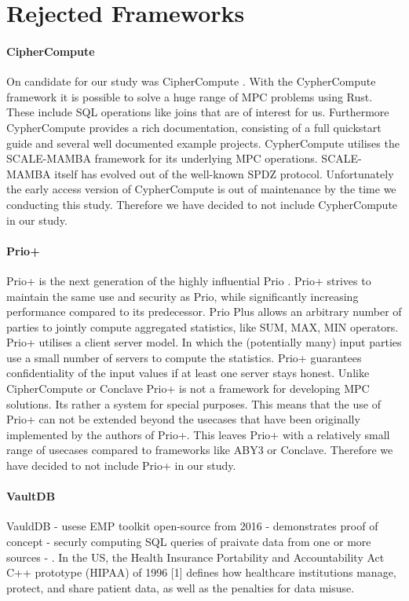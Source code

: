 \section{Rejected Frameworks}
\paragraph{CipherCompute}
On candidate for our study was CipherCompute \cite{Cosmian}. With the CypherCompute framework it is possible to solve a huge range of MPC problems using Rust. These include SQL operations like joins that are of interest for us. Furthermore CypherCompute provides a rich documentation, consisting of a full quickstart guide and several well documented example projects. CypherCompute utilises the SCALE-MAMBA \cite{aly2021scale} framework for its underlying MPC operations. SCALE-MAMBA  itself has evolved out of the well-known SPDZ \cite{SPDZ} protocol. Unfortunately the early access version of CypherCompute is out of maintenance by the time we conducting this study. Therefore we have decided to not include CypherCompute in our study.

\paragraph{Prio+}
Prio+ \cite{cryptoeprint:2021:576} is the next generation of the highly influential Prio \cite{201553}. Prio+ strives to maintain the same use and security as Prio, while significantly increasing performance compared to its predecessor. Prio Plus allows an arbitrary number of parties to jointly compute aggregated statistics, like SUM, MAX, MIN operators. Prio+ utilises a client server model. In which the (potentially many) input parties use a small number of servers to compute the statistics. Prio+ guarantees confidentiality of the input values if at least one server stays honest. Unlike CipherCompute or Conclave Prio+ is not a framework for developing MPC solutions. Its rather a system for special purposes. This means that the use of Prio+ can not be extended beyond the usecases that have been originally implemented by the authors of Prio+. This leaves Prio+ with a relatively small range of usecases compared to frameworks like ABY3 or Conclave. Therefore we have decided to not include Prio+ in our study.

\paragraph{VaultDB}
VauldDB \cite{rogers2022vaultdb} 
- usese EMP toolkit \cite{emp-toolkit} open-source  from 2016
- demonstrates proof of concept 
- securly computing SQL queries of praivate data from one or more sources 
- . In the US, the Health Insurance Portability and Accountability Act
C++ prototype
(HIPAA) of 1996 [1] defines how healthcare institutions manage, protect, and share patient data, as well as the penalties for data misuse. 


 